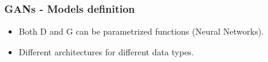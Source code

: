 \documentclass{beamer}
\begin{document}
\begin{frame}
	\frametitle{GANs - Models definition}
	\begin{itemize}
		\item Both D and G can be parametrized functions (Neural Networks).
		\item Different architectures for different data types.
		\begin{itemize}
		\end{itemize}
	\end{itemize}
\end{frame}
\end{document}
